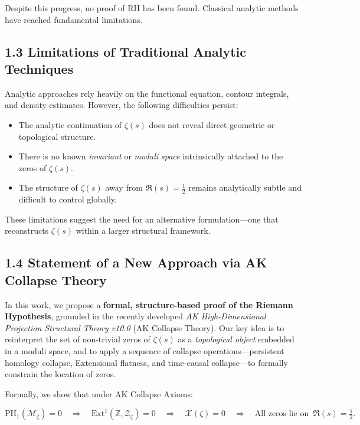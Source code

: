 \documentclass[11pt]{article}
\newcommand{\Sha}{\mathcal{X}}
\begin{document}
Despite this progress, no proof of RH has been found. Classical analytic methods have reached fundamental limitations.

\subsection{1.3 Limitations of Traditional Analytic Techniques}

Analytic approaches rely heavily on the functional equation, contour integrals, and density estimates.  
However, the following difficulties persist:

\begin{itemize}
    \item The analytic continuation of $\zeta(s)$ does not reveal direct geometric or topological structure.
    \item There is no known \emph{invariant} or \emph{moduli space} intrinsically attached to the zeros of $\zeta(s)$.
    \item The structure of $\zeta(s)$ away from $\Re(s) = \tfrac{1}{2}$ remains analytically subtle and difficult to control globally.
\end{itemize}

These limitations suggest the need for an alternative formulation—one that reconstructs $\zeta(s)$ within a larger structural framework.

\subsection{1.4 Statement of a New Approach via AK Collapse Theory}

In this work, we propose a \textbf{formal, structure-based proof of the Riemann Hypothesis}, grounded in the recently developed \emph{AK High-Dimensional Projection Structural Theory v10.0} (AK Collapse Theory).  
Our key idea is to reinterpret the set of non-trivial zeros of $\zeta(s)$ as a \emph{topological object} embedded in a moduli space,  
and to apply a sequence of collapse operations—persistent homology collapse, Extensional flatness, and time-causal collapse—to formally constrain the location of zeros.

Formally, we show that under AK Collapse Axioms:

\[
\mathrm{PH}_1(\mathcal{M}_\zeta) = 0 
\quad \Rightarrow \quad 
\mathrm{Ext}^1(\mathbb{Z}, \mathcal{Z}_\zeta) = 0 
\quad \Rightarrow \quad 
\Sha(\zeta) = 0 
\quad \Rightarrow \quad 
\text{All zeros lie on } \, \Re(s) = \tfrac{1}{2}.
\]
\end{document}
